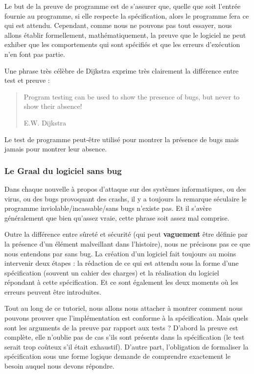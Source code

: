\documentclass[12pt,francais,]{scrbook}
\begin{document}
Le but de la preuve de programme est de s'assurer que, quelle que soit
l'entrée fournie au programme, si elle respecte la spécification, alors
le programme fera ce qui est attendu. Cependant, comme nous ne pouvons
pas tout essayer, nous allons établir formellement, mathématiquement, la
preuve que le logiciel ne peut exhiber que les comportements qui sont
spécifiés et que les erreurs d'exécution n'en font pas partie.

Une phrase très célèbre de Dijkstra exprime très clairement la
différence entre test et preuve :

\begin{quote}
Program testing can be used to show the presence of bugs, but never to
show their absence!

E.W. Dijkstra
\end{quote}

Le test de programme peut-être utilisé pour montrer la présence de bugs
mais jamais pour montrer leur absence.

\subsubsection{Le Graal du logiciel sans
bug}\label{le-graal-du-logiciel-sans-bug}

Dans chaque nouvelle à propos d'attaque sur des systèmes informatiques,
ou des virus, ou des bugs provoquant des crashs, il y a toujours la
remarque séculaire \og{}le programme inviolable/incassable/sans bugs
n'existe pas\fg{}. Et il s'avère généralement que bien qu'assez vraie,
cette phrase soit assez mal comprise.

Outre la différence entre sûreté et sécurité (qui peut
\textbf{vaguement} être définie par la présence d'un élément malveillant
dans l'histoire), nous ne précisons pas ce que nous entendons par \og{}sans
bug\fg{}. La création d'un logiciel fait toujours au moins intervenir deux
étapes : la rédaction de ce qui est attendu sous la forme d'une
spécification (souvent un cahier des charges) et la réalisation du
logiciel répondant à cette spécification. Et ce sont également les deux
moments où les erreurs peuvent être introduites.

Tout au long de ce tutoriel, nous allons nous attacher à montrer comment
nous pouvons prouver que l'implémentation est conforme à la
spécification. Mais quels sont les arguments de la preuve par rapport
aux tests ? D'abord la preuve est complète, elle n'oublie pas de cas
s'ils sont présents dans la spécification (le test serait trop coûteux
s'il était exhaustif). D'autre part, l'obligation de formaliser la
spécification sous une forme logique demande de comprendre exactement le
besoin auquel nous devons répondre.
\end{document}
